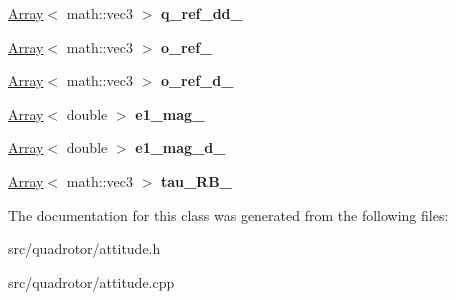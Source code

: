 \begin{DoxyCompactItemize}
\item 
\hypertarget{classAttitude_adafdcc5ea0edf640443a54e0a1c8195e}{
\hyperlink{classArray}{Array}$<$ math::vec3 $>$ {\bfseries q\_\-ref\_\-dd\_\-}}
\label{classAttitude_adafdcc5ea0edf640443a54e0a1c8195e}

\item 
\hypertarget{classAttitude_a07ff1dc9f3a307aaa7744c4cc18b85b2}{
\hyperlink{classArray}{Array}$<$ math::vec3 $>$ {\bfseries o\_\-ref\_\-}}
\label{classAttitude_a07ff1dc9f3a307aaa7744c4cc18b85b2}

\item 
\hypertarget{classAttitude_ada75e65bfb26b7656e76cbd5500d2a66}{
\hyperlink{classArray}{Array}$<$ math::vec3 $>$ {\bfseries o\_\-ref\_\-d\_\-}}
\label{classAttitude_ada75e65bfb26b7656e76cbd5500d2a66}

\item 
\hypertarget{classAttitude_a96f44c3ffba76b9cc233fca1727b23ff}{
\hyperlink{classArray}{Array}$<$ double $>$ {\bfseries e1\_\-mag\_\-}}
\label{classAttitude_a96f44c3ffba76b9cc233fca1727b23ff}

\item 
\hypertarget{classAttitude_a45e77bc2aa5f7f449ea6d813465b6390}{
\hyperlink{classArray}{Array}$<$ double $>$ {\bfseries e1\_\-mag\_\-d\_\-}}
\label{classAttitude_a45e77bc2aa5f7f449ea6d813465b6390}

\item 
\hypertarget{classAttitude_ac1877b6ed64892ddcffc95e95591b484}{
\hyperlink{classArray}{Array}$<$ math::vec3 $>$ {\bfseries tau\_\-RB\_\-}}
\label{classAttitude_ac1877b6ed64892ddcffc95e95591b484}

\end{DoxyCompactItemize}


The documentation for this class was generated from the following files:\begin{DoxyCompactItemize}
\item 
src/quadrotor/attitude.h\item 
src/quadrotor/attitude.cpp\end{DoxyCompactItemize}

